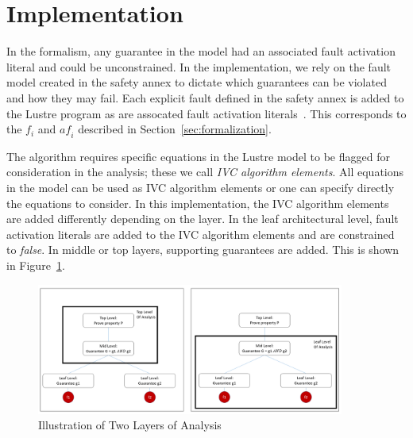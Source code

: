 \section{Implementation}
\label{sec:impl}
In the formalism, any guarantee in the model had an associated fault activation literal and could be unconstrained. In the implementation, we rely on the fault model created in the safety annex to dictate which guarantees can be violated and how they may fail. Each explicit fault defined in the safety annex is added to the Lustre program as are assocated fault activation literals~\cite{Stewart17:IMBSA,stewart2020safety}. This corresponds to the $f_i$ and $\mathit{af}_i$ described in Section~\ref{sec:formalization}. 

The \aivcalg algorithm requires  specific equations in the Lustre model to be flagged for consideration in the analysis; these we call \emph{IVC algorithm elements}. All equations in the model can be used as IVC algorithm elements or one can specify directly the equations to consider. In this implementation, the IVC algorithm elements are added differently depending on the layer. In the leaf architectural level, fault activation literals are added to the IVC algorithm elements and are constrained to {\em false}. In middle or top layers, supporting guarantees are added. This is shown in Figure~\ref{fig:layers}. 

\begin{figure}[h!]
	\begin{center}
		\includegraphics[width=0.9\textwidth]{images/twoLevels.PNG}
	\end{center}
	\vspace{-2em}
	\caption{Illustration of Two Layers of Analysis}
	\label{fig:layers}
	\vspace{-2em}
\end{figure}

